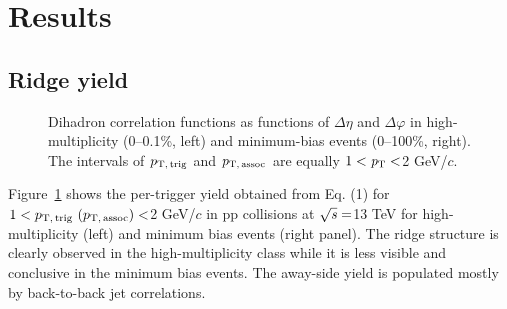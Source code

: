 
\section {Results}
\label{sec:results}

\subsection{Ridge yield}

\begin{figure}[h!]
	\centering
	\caption{ Dihadron correlation functions as functions of $\Delta\eta$ and $\Delta\varphi$ in high-multiplicity (0--0.1\%, left) and minimum-bias events (0--100\%, right). The intervals of $p_\mathrm{T,\,trig}$ and $p_\mathrm{T,\,assoc}$ are equally $1 < \it{p}_{\rm{T}} < $2 GeV/$c$. }
	\label{fig:PlotCorrMBHMT}
\end{figure}

Figure~\ref{fig:PlotCorrMBHMT} shows the per-trigger yield obtained from Eq. (1) for $1 < p_\mathrm{T,\,trig}~\mathrm (p_\mathrm{T,\,assoc}) < $2 GeV/$c$ in pp collisions at $\sqrt{\it{s}} = $\unit{13} {\rm{}TeV} for high-multiplicity (left) and minimum bias events (right panel). The ridge structure is clearly observed in the high-multiplicity class while it is less visible and conclusive in the minimum bias events. The away-side yield is populated mostly by back-to-back jet correlations.

